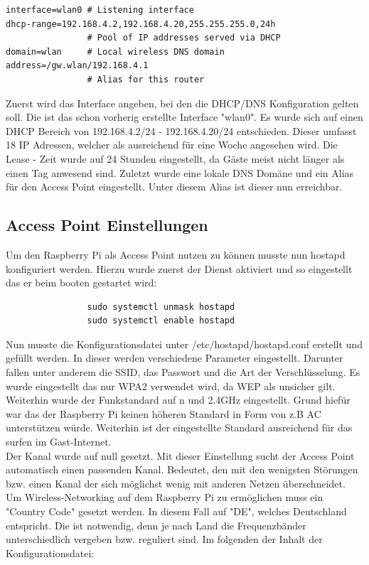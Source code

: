 \documentclass[a4paper,11pt,singlespacing]{article}
\begin{document}
            
                \begin{lstlisting}
interface=wlan0 # Listening interface
dhcp-range=192.168.4.2,192.168.4.20,255.255.255.0,24h
                # Pool of IP addresses served via DHCP
domain=wlan     # Local wireless DNS domain
address=/gw.wlan/192.168.4.1
                # Alias for this router
                \end{lstlisting}  
                Zuerst wird das Interface angeben, bei den die DHCP/DNS Konfiguration gelten soll. Die ist das schon vorherig erstellte Interface "wlan0". Es wurde sich auf einen DHCP Bereich von 192.168.4.2/24 - 192.168.4.20/24 entschieden. Dieser umfasst 18 IP Adressen, welcher als ausreichend für eine Woche angesehen wird. Die Lease - Zeit wurde auf 24 Stunden eingestellt, da Gäste meist nicht länger als einen Tag anwesend sind.
                Zuletzt wurde eine lokale DNS Domäne und ein Alias für den Access Point eingestellt. Unter diesem Alias ist dieser nun erreichbar.


            \subsection{Access Point Einstellungen}
                Um den Raspberry Pi als Access Point nutzen zu können musste nun hostapd konfiguriert werden. Hierzu wurde zuerst der Dienst aktiviert und so eingestellt das er beim booten gestartet wird:
                  \begin{lstlisting}
                sudo systemctl unmask hostapd
                sudo systemctl enable hostapd
                  \end{lstlisting} 
                
                    Nun musste die Konfigurationsdatei unter /etc/hostapd/hostapd.conf erstellt und gefüllt werden.
                    In dieser werden verschiedene Parameter eingestellt. Darunter fallen unter anderem die SSID, das Passwort und die Art der Verschlüsselung. Es wurde eingestellt das nur WPA2 verwendet wird, da WEP als unsicher gilt. Weiterhin wurde der Funkstandard auf n und 2.4GHz eingestellt. Grund hiefür war das der Raspberry Pi keinen höheren Standard in Form von z.B AC unterstützen würde. Weiterhin ist der eingestellte Standard ausreichend  für das surfen im Gast-Internet. \\
                    Der Kanal wurde auf null gesetzt. Mit dieser Einstellung sucht der Access Point automatisch einen passenden Kanal. Bedeutet, den mit den wenigsten Störungen bzw. einen Kanal der sich möglichst wenig mit anderen Netzen überschneidet.\\
                    Um Wireless-Networking auf dem Raspberry Pi zu ermöglichen muss ein "Country Code" gesetzt werden. In diesem Fall auf "DE", welches Deutschland entspricht. Die ist notwendig, denn je nach Land die Frequenzbänder unterschiedlich vergeben bzw. reguliert sind. Im folgenden der Inhalt der Konfigurationsdatei:
 
\end{document}

